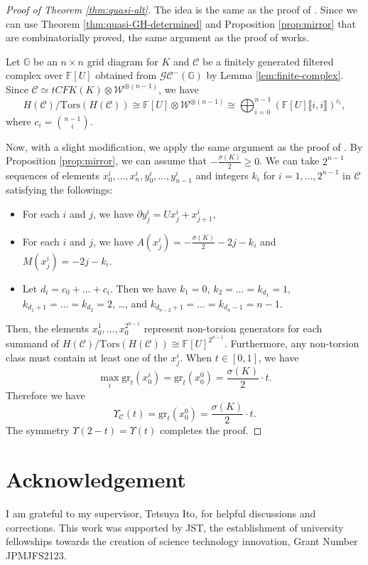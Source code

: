 \documentclass[12pt]{amsart}
\theoremstyle{plain}
\theoremstyle{definition}
\theoremstyle{plain}
\theoremstyle{definition}
\newcommand{\G}{\mathbb{G}}
\numberwithin{equation}{section}
\begin{document}
\begin{proof}[Proof of Theorem \ref{thm:quasi-alt}]
The idea is the same as the proof of \cite[Theorem 1.14]{Concordance-homomorphisms-from-knot-Floer-homology}.
Since we can use Theorem \ref{thm:quasi-GH-determined} and Proposition \ref{prop:mirror} that are combinatorially proved, the same argument as the proof of \cite[Theorem 1.14]{Concordance-homomorphisms-from-knot-Floer-homology} works.

Let $\G$ be an $n\times n$ grid diagram for $K$ and $\mathcal{C}$ be a finitely generated filtered complex over $\mathbb{F}[U]$ obtained from $\mathcal{GC}^-(\G)$ by Lemma \ref{lem:finite-complex}.
Since $\mathcal{C}\simeq tCFK(K)\otimes \mathcal{W}^{\otimes (n-1)}$, we have
\[
H(\mathcal{C})/\mathrm{Tors}(H(\mathcal{C}))\cong  \mathbb{F}[U]\otimes \mathcal{W}^{\otimes (n-1)} \cong \bigoplus_{i=0}^{n-1} (\mathbb{F}[U]\llbracket i,i\rrbracket) ^{c_i},
\]
where $c_i=\binom{n-1}{i}$.



Now, with a slight modification, we apply the same argument as the proof of \cite[Theorem 1.14]{Concordance-homomorphisms-from-knot-Floer-homology}.
By Proposition \ref{prop:mirror}, we can assume that $-\frac{\sigma(K)}{2}\geq 0$.
We can take $2^{n-1}$ sequences of elements $x^i_0,\dots,x^i_n,y^i_0,\dots,y^i_{n-1}$ and integers $k_i$ for $i=1,\dots,2^{n-1}$ in $\mathcal{C}$ satisfying the followings:
\begin{itemize}
    \item For each $i$ and $j$, we have $\partial y^i_j=U x^i_j+x^i_{j+1}$,
    \item For each $i$ and $j$, we have $A(x^i_j)=-\frac{\sigma(K)}{2}-2j-k_i$ and $M(x^i_j)=-2j-k_i$.
    \item Let $d_i=c_0+\dots+c_{i}$. Then we have $k_1=0$, $k_2=\dots=k_{d_1}=1$, $k_{d_1+1}=\dots=k_{d_2}=2$, \dots, and $k_{d_{n-2}+1}=\dots=k_{d_n-1}=n-1$.
\end{itemize}
Then, the elements $x^1_0, \dots, x^{2^{n-1}}_0$ represent non-torsion generators for each summand of $H(\mathcal{C})/\mathrm{Tors}(H(\mathcal{C}))\cong \mathbb{F}[U]^{2^{n-1}}$.
Furthermore, any non-torsion class must contain at least one of the $x^i_j$.
When $t\in[0,1]$, we have 
\[
\max_{i}\mathrm{gr}_t(x^i_0)=\mathrm{gr}_t(x^0_0)=\frac{\sigma(K)}{2}\cdot t.
\]
Therefore we have
\[
\Upsilon_\mathcal{C}(t)=\mathrm{gr}_t(x^0_0)=\frac{\sigma(K)}{2}\cdot t.
\]
The symmetry $\Upsilon(2-t)=\Upsilon(t)$ completes the proof.
\end{proof}



\section{Acknowledgement}
I am grateful to my supervisor, Tetsuya Ito, for helpful discussions and corrections.
This work was supported by JST, the establishment of university fellowships towards
the creation of science technology innovation, Grant Number JPMJFS2123.



 
\end{document}
